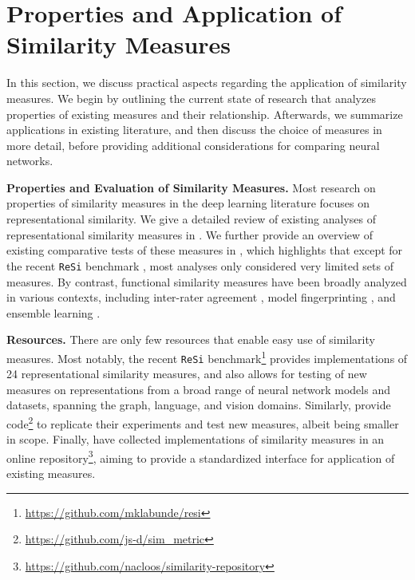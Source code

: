 \documentclass{article}
\newcommand{\citet}{\textcite}
\newcommand{\subheader}{\textbf}
\begin{document}
\section{Properties and Application of Similarity Measures}\label{sec:application}
In this section, we discuss practical aspects regarding the application of similarity measures.
We begin by outlining the current state of research that analyzes properties of existing measures and their relationship.
Afterwards, we summarize applications in existing literature, and then discuss the choice of measures in more detail, before providing additional considerations for comparing neural networks.




\subheader{Properties and Evaluation of Similarity Measures.}
Most research on properties of similarity measures in the deep learning literature focuses on representational similarity.
We give a detailed review of existing analyses of representational similarity measures in .
We further provide an overview of existing comparative tests of these measures in , which highlights that except for the recent \texttt{ReSi} benchmark \cite{resi_benchmark_2024}, most analyses only considered very limited sets of measures.
By contrast, functional similarity measures have been broadly analyzed in various contexts, including inter-rater agreement \cite{sim_kappa_2005,stemler_comparison_2019,maclure_misinterpretation_1987}, model fingerprinting \cite{sun_deep_2023}, and ensemble learning \cite{kuncheva_measures_2003}.


\subheader{Resources.}
There are only few resources that enable easy use of similarity measures.
Most notably, the recent \texttt{ReSi} benchmark\footnote{\url{https://github.com/mklabunde/resi}}
\cite{resi_benchmark_2024} provides implementations of 24 representational similarity measures, and also allows for testing of new measures on representations from a broad range of neural network models and datasets, spanning the graph, language, and vision domains.
Similarly, \citet{ding_grounding_2021} provide code\footnote{\url{https://github.com/js-d/sim_metric}}
to replicate their experiments and test new measures, albeit being smaller in scope.
Finally, \citet{cloos2024a} have collected implementations of similarity measures in an online repository\footnote{\url{https://github.com/nacloos/similarity-repository}},
aiming to provide a standardized interface for application of existing measures.
\end{document}
